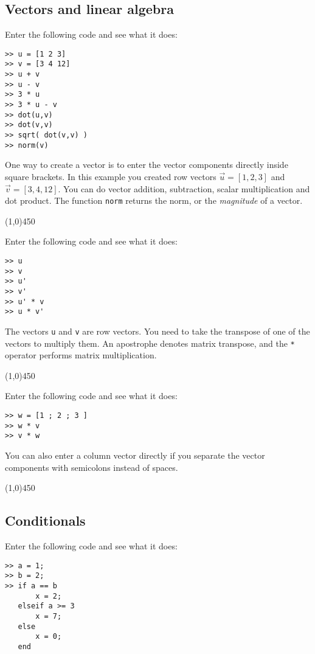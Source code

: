 \documentclass[12pt,a4paper]{article}   %
\newcommand{\code}[1]{\texttt{#1}}
\newcommand{\ruler}{
  \begin{center}
    \line(1,0){450}
  \end{center}
}
\begin{document}
\subsection{Vectors and linear algebra}

Enter the following code and see what it does:

\begin{verbatim}
>> u = [1 2 3]
>> v = [3 4 12]
>> u + v
>> u - v
>> 3 * u
>> 3 * u - v
>> dot(u,v)
>> dot(v,v)
>> sqrt( dot(v,v) )
>> norm(v)
\end{verbatim}

One way to create a vector is to enter the vector components directly inside square brackets.
In this example you created row vectors $\vec{u} = [1,2,3]$ and $\vec{v} = [3,4,12]$. You can
do vector addition, subtraction, scalar multiplication and dot product. The function \code{norm} 
returns the norm, or the \textit{magnitude} of a vector.


\ruler

Enter the following code and see what it does:

\begin{verbatim}
>> u
>> v
>> u'
>> v'
>> u' * v
>> u * v'
\end{verbatim}

The vectors \code{u} and \code{v} are row vectors. You need to take the transpose of one
of the vectors to multiply them. An apostrophe denotes matrix transpose, and the \code{*}
operator performs matrix multiplication.


\ruler

Enter the following code and see what it does:

\begin{verbatim}
>> w = [1 ; 2 ; 3 ]
>> w * v
>> v * w
\end{verbatim}

You can also enter a column vector directly if you separate the vector components with
semicolons instead of spaces.


\ruler

\subsection{Conditionals}

Enter the following code and see what it does:

\begin{verbatim}
>> a = 1;
>> b = 2;
>> if a == b
       x = 2;
   elseif a >= 3
       x = 7;
   else
       x = 0;
   end
\end{verbatim}
\end{document}
